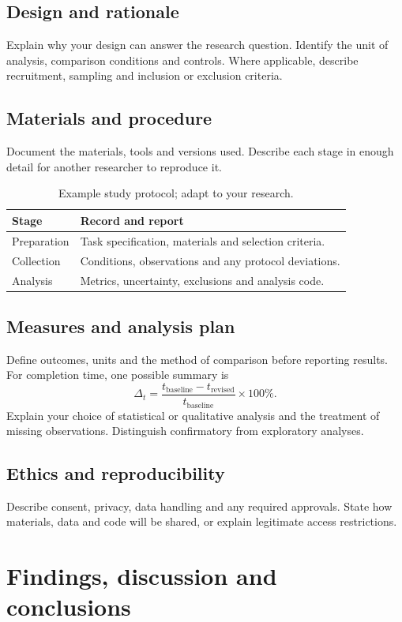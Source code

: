 \documentclass[11pt,a4paper,oneside]{report}
\begin{document}
\section{Design and rationale}
Explain why your design can answer the research question. Identify the unit of
analysis, comparison conditions and controls. Where applicable, describe
recruitment, sampling and inclusion or exclusion criteria.
\section{Materials and procedure}
Document the materials, tools and versions used. Describe each stage in enough
detail for another researcher to reproduce it.
\begin{table}[htbp]
\centering
\caption{Example study protocol; adapt to your research.}
\begin{tabularx}{\linewidth}{@{}lX@{}}
\toprule
\textbf{Stage} & \textbf{Record and report}\\
\midrule
Preparation & Task specification, materials and selection criteria.\\
Collection & Conditions, observations and any protocol deviations.\\
Analysis & Metrics, uncertainty, exclusions and analysis code.\\
\bottomrule
\end{tabularx}
\end{table}
\section{Measures and analysis plan}
Define outcomes, units and the method of comparison before reporting results.
For completion time, one possible summary is
\begin{equation}
\Delta_t = \frac{t_{\mathrm{baseline}}-t_{\mathrm{revised}}}{t_{\mathrm{baseline}}}\times100\%.
\end{equation}
Explain your choice of statistical or qualitative analysis and the treatment of
missing observations. Distinguish confirmatory from exploratory analyses.
\section{Ethics and reproducibility}
Describe consent, privacy, data handling and any required approvals. State how
materials, data and code will be shared, or explain legitimate access restrictions.

\chapter{Findings, discussion and conclusions}
\label{ch:findings}
\end{document}
